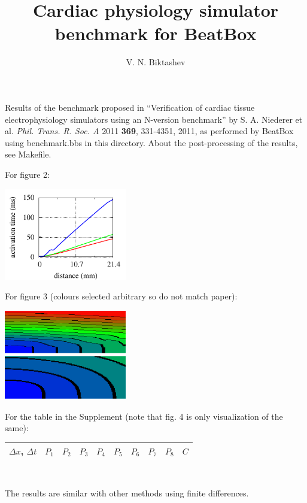 \documentclass[11pt,a4paper]{article}
\begin{document}
\title{\vspace*{-5ex}
Cardiac physiology simulator benchmark for BeatBox}
\author{V. N. Biktashev}
\date{}
\maketitle
\thispagestyle{empty}


Results of the benchmark proposed in ``Verification of cardiac tissue
electrophysiology simulators using an N-version benchmark'' by
S. A. Niederer et al. \textit{Phil. Trans. R. Soc. A} 2011
\textbf{369}, 331-4351, 2011, as performed by BeatBox using
benchmark.bbs in this directory. About the post-processing of the
results, see Makefile.

\bigskip

For figure 2: \\[-1\baselineskip]

\centerline{\includegraphics[width=0.4\textwidth]{graph.pdf}}

\bigskip 

For figure 3 (colours selected arbitrary so do not match paper):

\begin{centering}
  \includegraphics[width=0.4\textwidth]{upper.pdf} \\[1ex]
  \includegraphics[width=0.4\textwidth]{lower.pdf} \\
\end{centering}

\bigskip 

For the table in the Supplement (note that fig. 4 is only
visualization of the same):

\begin{centering}
\begin{tabular}{l|lllllllll}
  $\Delta x$, $\Delta t$ & $P_1$ & $P_2$ & $P_3$ & $P_4$ & 
  $P_5$ & $P_6$ & $P_7$ & $P_8$ & $C$ \\\hline
  
\end{tabular}\\
\end{centering}

\bigskip 

The results are similar with other methods using finite differences. 
\end{document}

